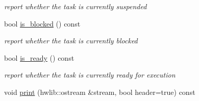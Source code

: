 \begin{DoxyCompactItemize}
\begin{DoxyCompactList}\small\item\em report whether the task is currently suspended \end{DoxyCompactList}\item 
bool \hyperlink{classrtos_1_1task__base_ab2ee997d623c41c5a5d7df04f2d3a472}{is\+\_\+blocked} () const \hypertarget{classrtos_1_1task__base_ab2ee997d623c41c5a5d7df04f2d3a472}{}\label{classrtos_1_1task__base_ab2ee997d623c41c5a5d7df04f2d3a472}

\begin{DoxyCompactList}\small\item\em report whether the task is currently blocked \end{DoxyCompactList}\item 
bool \hyperlink{classrtos_1_1task__base_a2c4bfcd2344154273044c1f7c2883a2c}{is\+\_\+ready} () const \hypertarget{classrtos_1_1task__base_a2c4bfcd2344154273044c1f7c2883a2c}{}\label{classrtos_1_1task__base_a2c4bfcd2344154273044c1f7c2883a2c}

\begin{DoxyCompactList}\small\item\em report whether the task is currently ready for execution \end{DoxyCompactList}\item 
void \hyperlink{classrtos_1_1task__base_a0b79c3c2b76ce32284638467cec95c65}{print} (hwlib\+::ostream \&stream, bool header=true) const \hypertarget{classrtos_1_1task__base_a0b79c3c2b76ce32284638467cec95c65}{}\label{classrtos_1_1task__base_a0b79c3c2b76ce32284638467cec95c65}


\end{DoxyCompactItemize}
